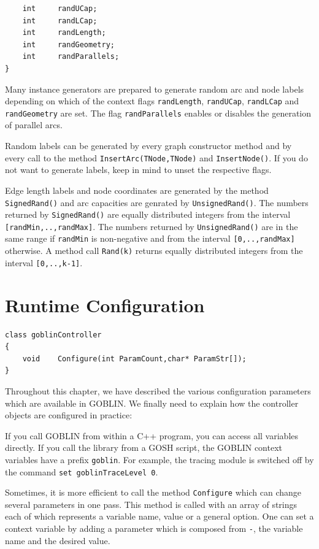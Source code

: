 \documentclass[a4paper,11pt,twoside]{book}
\begin{document}
\begin{multicols}{2}
\begin{mymethods}
\begin{verbatim}
    int     randUCap;
    int     randLCap;
    int     randLength;
    int     randGeometry;
    int     randParallels;
}
\end{verbatim}
\end{mymethods}
Many instance generators are prepared to generate random arc and node labels
depending on which of the context flags \verb/randLength/, \verb/randUCap/, 
\verb/randLCap/ and \verb/randGeometry/ are set. The flag \verb/randParallels/
enables or disables the generation of parallel arcs.

Random labels can be generated by every graph constructor method and by every
call to the method \verb/InsertArc(TNode,TNode)/ and \verb/InsertNode()/. If
you do not want to generate labels, keep in mind to unset the respective flags.

Edge length labels and node coordinates are generated by the method
\verb/SignedRand()/ and arc capacities are genrated by \verb/UnsignedRand()/.
The numbers returned by \verb/SignedRand()/ are equally distributed integers
from the interval \verb/[randMin,..,randMax]/. The numbers returned
by \verb/UnsignedRand()/ are in the same range if \verb/randMin/ is
non-negative and from the interval \verb/[0,..,randMax]/ otherwise.
A method call \verb/Rand(k)/ returns equally distributed
integers from the interval \verb/[0,..,k-1]/.



\newpage
\section{Runtime Configuration}
\label{slb_rconf}
\begin{mymethods}
\begin{verbatim}
class goblinController
{
    void    Configure(int ParamCount,char* ParamStr[]);
}
\end{verbatim}
\end{mymethods}
Throughout this chapter, we have described the various configuration
parameters which are available in GOBLIN. We finally need to explain how the
controller objects are configured in practice:

If you call GOBLIN from within a C++ program, you can access all variables
directly. If you call the library from a GOSH script, the GOBLIN context
variables have a prefix \verb/goblin/. For example, the tracing module is
switched off by the command \verb/set goblinTraceLevel 0/.
 
Sometimes, it is more efficient to call the method \verb/Configure/ which can
change several parameters in one pass. This method is called with an array of
strings each of which represents a variable name, value or a general option.
One can set a context variable by adding a parameter which is composed from
\verb/-/, the variable name and the desired value.


\end{multicols}
\end{document}
